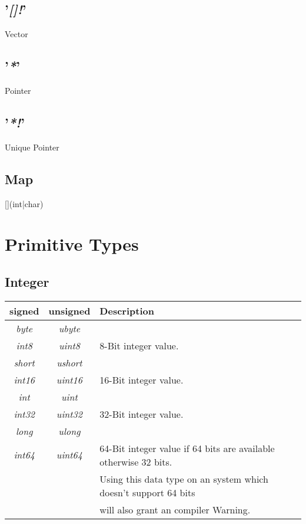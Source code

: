 \documentclass[10pt,a4paper]{article}
\begin{document}
\subsection{'\textit{[]!}'}
Vector


\subsection{'\textit{*}'}
Pointer


\subsection{'\textit{*!}'}
Unique Pointer


\subsection{Map}
[](int|char)


\section{Primitive Types}


\subsection{Integer}
\begin{tabular}{c|c|l}
signed			& unsigned			 	& Description\\ \hline \hline
\textit{byte}	& \textit{ubyte}		&  \\
\textit{int8}	& \textit{uint8}		& 8-Bit integer value. \\ \hline

\textit{short}	& \textit{ushort}		&  \\
\textit{int16}	& \textit{uint16}		& 16-Bit integer value. \\ \hline

\textit{int}	& \textit{uint}			&  \\
\textit{int32}	& \textit{uint32}		& 32-Bit integer value. \\ \hline

\textit{long}	& \textit{ulong}		&  \\
\textit{int64}	& \textit{uint64}		& 64-Bit integer value if 64 bits are available otherwise 32 bits. \\
				&						& Using this data type on an system which doesn't support 64 bits \\
				&						& will also grant an compiler Warning. \\
\end{tabular}
\end{document}
